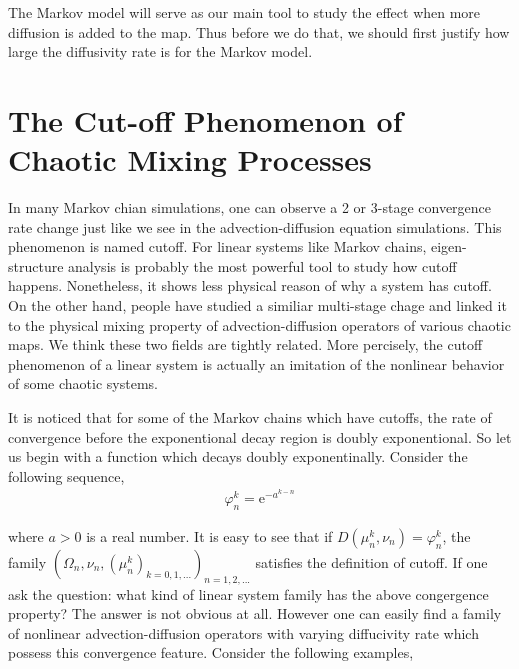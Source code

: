 \documentclass{article}
\begin{document}
The Markov model will serve as our main tool to study the effect when more diffusion is added to the map. Thus before we do that, we should first justify how large the diffusivity rate is for the
Markov model.





\section{The Cut-off Phenomenon of Chaotic Mixing Processes}
\label{The Cut-off Phenomenon of Chaotic Mixing Processes}
In many Markov chian simulations, one can observe a 2 or 3-stage convergence rate change just like we see in the advection-diffusion equation simulations. This phenomenon is named cutoff. For linear systems like Markov chains, eigen-structure analysis is probably the most powerful tool to study how cutoff happens. Nonetheless, it shows less physical reason of why a system has cutoff. On the other hand, people have studied a similiar multi-stage chage and linked it to the physical mixing property of advection-diffusion operators of various chaotic maps. We think these two fields are tightly related. More percisely, the cutoff phenomenon of a linear system is actually an imitation of the nonlinear behavior of some chaotic systems.


It is noticed that for some of the Markov chains which have cutoffs, the rate of convergence before the exponentional decay
region is doubly exponentional. So let us begin with a function which decays doubly exponentinally. Consider the following sequence,
 \begin{eqnarray}
 \label{doublyconvergence}
 \varphi^k_n = \text{e}^{-a^{k-n}}
 \end{eqnarray}

where $a>0$ is a real number. It is easy to see that if $D(\mu^k_n,\nu_n)=\varphi^k_n$, the family $(\Omega_n,\nu_n, (\mu^k_n)_{k=0,1,...})_{n=1,2,...}$ satisfies the definition of cutoff. If one ask the question: what kind of linear system family has the above congergence property? The answer is not obvious at all. However one can easily find a family of nonlinear advection-diffusion operators with varying diffucivity rate which possess this convergence feature. Consider the following examples,
\end{document}
